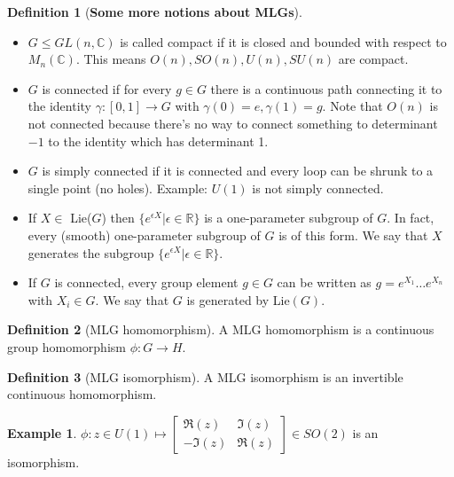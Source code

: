 \documentclass{book}
\theoremstyle{definition}
\newtheorem{defn}{Definition}[section]
\newtheorem{exmp}{Example}[section]
\newcommand{\R}{\mathbb{R}}
\newcommand{\C}{\mathbb{C}}
\newcommand{\ep}{\epsilon}
\begin{document}
\begin{defn}[\textbf{Some more notions about MLGs}]
	$\,$
	\begin{itemize}
		\item $G \leq GL(n,\C)$ is called compact if it is closed and bounded with respect to $M_n(\C)$. This means $O(n),SO(n), U(n), SU(n)$ are compact.  
		\item $G$ is connected if for every $g\in G$ there is a continuous path connecting it to the identity $\gamma: [0,1] \to G$ with $\gamma(0) = e, \gamma(1) = g$. Note that $O(n)$ is not connected because there's no way to connect something to determinant $-1$ to the identity which has determinant 1.  
		\item $G$ is simply connected if it is connected and every loop can be shrunk to a single point (no holes). Example: $U(1)$ is not simply connected.
		\item If $X\in$ Lie($G$) then $\{ e^{\ep X} \vert \ep \in \R\}$ is a one-parameter subgroup of $G$. In fact, every (smooth) one-parameter subgroup of $G$ is of this form. We say that $X$ generates the subgroup $\{ e^{\ep X}\vert \ep \in \R \}$. 
		\item If $G$ is connected, every group element $g\in G$ can be written as $g = e^{X_1}\dots e^{X_n}$ with $X_i \in G$. We say that $G$ is generated by Lie$(G)$. 
	
		
	\end{itemize}
\end{defn}




\begin{defn}[MLG homomorphism]
	A MLG homomorphism is a continuous group homomorphism $\phi : G \to H$. 
\end{defn}

\begin{defn}[MLG isomorphism]
	A MLG isomorphism is an invertible continuous homomorphism. 
\end{defn}

\begin{exmp}
	$\phi : z \in U(1) \mapsto \begin{bmatrix}
	\Re(z) & \Im(z) \\ -\Im(z) & \Re(z)	\end{bmatrix}\in SO(2)$ is an isomorphism. 
\end{exmp}
\end{document}
